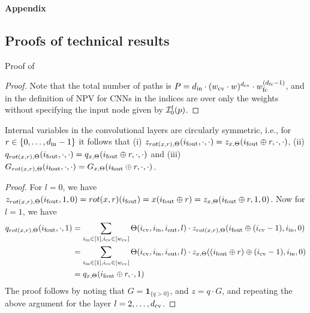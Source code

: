 \newpage
\onecolumn
\begin{center}
{\Large{\textbf{Appendix}}}
\end{center}

\begin{appendix}

\section{Proofs of technical results}

Proof of 
\begin{proof}
Note that the total number of paths is $P=d_{\text{in}}\cdot (w_{\text{cv}}\cdot w)^{d_{\text{cv}}} \cdot w_{\text{fc}}^{(d_{\text{fc}}-1)}$, and in the definition of NPV for CNNs in  the indices are over only the weights without specifying the input node given by $\mathcal{I}^{\text{f}}_{0}(p)$.
\end{proof}

\begin{proposition}\label{prop:rot}
Internal variables in the convolutional layers are circularly symmetric,  i.e., for $r\in\{0,\ldots,d_{\text{in}}-1\}$ it follows that (i) $z_{rot(x,r),\Theta}(i_{\text{fout}},\cdot,\cdot) = z_{x,\Theta}(i_{\text{fout}} \oplus r,\cdot,\cdot)$, (ii) $q_{rot(x,r),\Theta}(i_{\text{fout}},\cdot,\cdot) = q_{x,\Theta}(i_{\text{fout}} \oplus r,\cdot,\cdot)$ and (iii) $G_{rot(x,r),\Theta}(i_{\text{fout}},\cdot,\cdot) = G_{x,\Theta}(i_{\text{fout}} \oplus r,\cdot,\cdot)$.
\end{proposition}


\begin{proof}
For $l=0$, we have $z_{rot(x,r),\Theta}(i_{\text{fout}}, 1, 0) = rot(x,r)(i_{\text{fout}})= x(i_{\text{fout}}\oplus r) = z_{x,\Theta}(i_{\text{fout}}\oplus r, 1,0)$. Now for $l=1$, we have
\begin{align*}
q_{rot(x,r),\Theta}(i_{\text{fout}},\cdot,1) &= \sum_{i_{\text{in}}\in[1],i_{\text{cv}}\in[w_{\text{cv}}]}\Theta(i_{\text{cv}},i_{\text{in}},i_{\text{out}},l)\cdot z_{rot(x,r),\Theta}(i_{\text{fout}} \oplus(i_{\text{cv}}-1),i_{\text{in}},0)\\
&= \sum_{i_{\text{in}}\in[1],i_{\text{cv}}\in[w_{\text{cv}}]}\Theta(i_{\text{cv}},i_{\text{in}},i_{\text{out}},l)\cdot z_{x,\Theta}((i_{\text{fout}}\oplus r) \oplus (i_{\text{cv}}-1),i_{\text{in}},0)\\
&= q_{x,\Theta}(i_{\text{fout}}\oplus r,\cdot,1) 
\end{align*}
The proof follows by noting that $G=\mathbf{1}_{\{q>0\}}$, and $z=q\cdot G$, and repeating the above argument for the layer $l=2,\ldots, d_{\text{cv}}$.
\end{proof}



\end{appendix}
